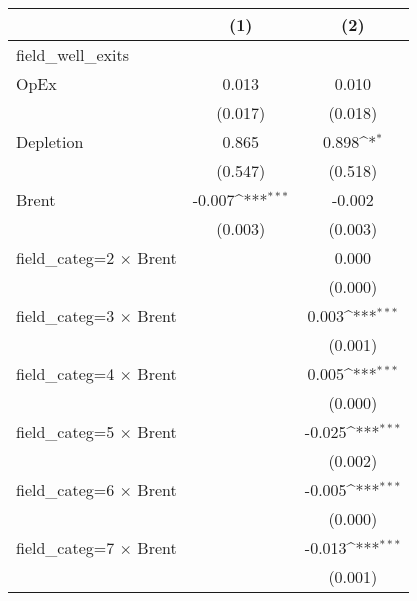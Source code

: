 {
\def\sym#1{\ifmmode^{#1}\else\(^{#1}\)\fi}
\begin{tabular}{l*{2}{c}}
\hline\hline
                                        &\multicolumn{1}{c}{(1)}         &\multicolumn{1}{c}{(2)}         \\
\hline
field\_well\_exits                        &                     &                     \\
OpEx                                    &       0.013         &       0.010         \\
                                        &     (0.017)         &     (0.018)         \\
Depletion                               &       0.865         &       0.898\sym{*}  \\
                                        &     (0.547)         &     (0.518)         \\
Brent                                   &      -0.007\sym{***}&      -0.002         \\
                                        &     (0.003)         &     (0.003)         \\
field\_categ=2 $\times$ Brent            &                     &       0.000         \\
                                        &                     &     (0.000)         \\
field\_categ=3 $\times$ Brent            &                     &       0.003\sym{***}\\
                                        &                     &     (0.001)         \\
field\_categ=4 $\times$ Brent            &                     &       0.005\sym{***}\\
                                        &                     &     (0.000)         \\
field\_categ=5 $\times$ Brent            &                     &      -0.025\sym{***}\\
                                        &                     &     (0.002)         \\
field\_categ=6 $\times$ Brent            &                     &      -0.005\sym{***}\\
                                        &                     &     (0.000)         \\
field\_categ=7 $\times$ Brent            &                     &      -0.013\sym{***}\\
                                        &                     &     (0.001)         \\

\end{tabular}}
